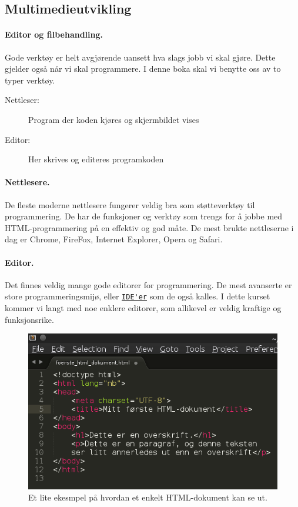 \documentclass[%
oneside,                 %
final,                   %
10pt]{article}
\begin{document}
\noindent

\subsection{Multimedieutvikling}
\label{section:teori:multimedieutvikling}

\paragraph{Editor og filbehandling.}
\label{section:teori:editorogfilbehandling}

Gode verktøy er helt avgjørende uansett hva slags jobb vi skal
gjøre. Dette gjelder også når vi skal programmere. I denne boka
skal vi benytte oss av to typer verktøy.

\begin{description}
\item[Nettleser:] 
  Program der koden kjøres og skjermbildet vises

\item[Editor:] 
  Her skrives og editeres programkoden 
\end{description}

\noindent
\paragraph{Nettlesere.}

De fleste moderne nettlesere fungerer veldig bra som støtteverktøy
til programmering. De har de funksjoner og verktøy som trengs for å
jobbe med HTML-programmering på en effektiv og god måte. De mest
brukte nettleserne i dag er Chrome, FireFox, Internet Explorer, Opera
og Safari.

\paragraph{Editor.}

Det finnes veldig mange gode editorer for programmering. De mest
avanserte er store programmeringsmijø, eller
\href{{http://en.wikipedia.org/wiki/Integrated_development_environment}}{\nolinkurl{IDE'er}}
som de også kalles. I dette kurset kommer vi langt med noe enklere
editorer, som allikevel er veldig kraftige og funksjonsrike.


\begin{figure}[t]
  \centerline{\includegraphics[width=0.5\linewidth]{figures/editor_sublime_eksempel.png}}
  \caption{
  Et lite ekesmpel på hvordan et enkelt HTML-dokument kan se ut.
  }
\end{figure}
\end{document}
